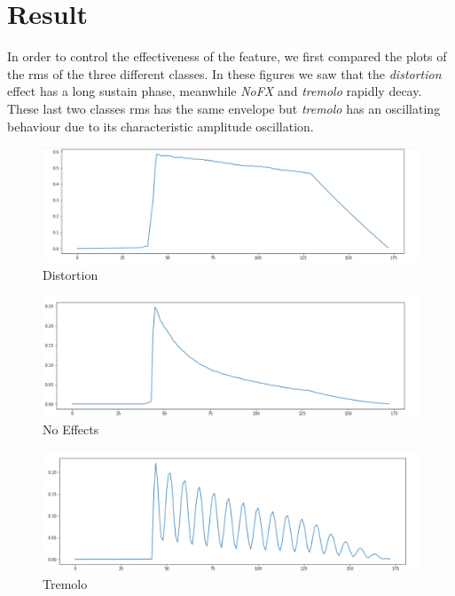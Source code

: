 \documentclass[a4paper,12pt]{report}
\begin{document}
\section{Result}

In order to control the effectiveness of the feature, we first compared the plots of the rms of the three different classes. In these figures we saw that the \emph{distortion} effect has a long sustain phase, meanwhile \emph{NoFX} and \emph{tremolo} rapidly decay. These last two classes rms has the same envelope but \emph{tremolo} has an oscillating behaviour due to its characteristic amplitude oscillation.\\

\begin{figure}[h]
\centering
\includegraphics[scale=.17]{distortion.png}
\caption{Distortion}
\end{figure}
\begin{figure}[h]
\centering
\includegraphics[scale=.17]{nofx.png}
\caption{No Effects}
\end{figure}
\begin{figure}[!h]
\centering
\includegraphics[scale=.17]{tremolo.png}
\caption{Tremolo}
\end{figure} 
\end{document}

